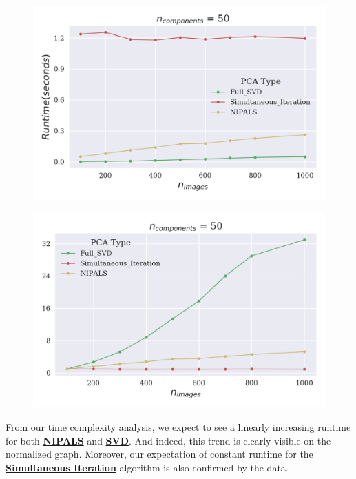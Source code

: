 \documentclass[12pt]{article}
\begin{document}
\begin{figure}[H]
\centering
\begin{minipage}{.45\textwidth}
  \centering
  \includegraphics[width=\linewidth]{UImages.png}
  \label{UImages}
\end{minipage}%
\quad
\begin{minipage}{.45\textwidth}
  \centering
  \includegraphics[width=\linewidth]{NImages.png}
  \label{NImages}
\end{minipage}
\end{figure}

From our time complexity analysis, we expect to see a linearly increasing runtime for both \textbf{\hyperref[3.1]{NIPALS}} and \textbf{\hyperref[3.2]{SVD}}. And indeed, this trend is clearly visible on the normalized graph. Moreover, our expectation of constant runtime for the \textbf{\hyperref[3.3]{Simultaneous Iteration}} algorithm is also confirmed by the data. 
\end{document}
